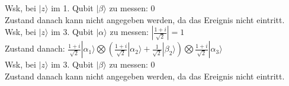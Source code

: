 \documentclass[a4paper]{scrartcl}
\begin{document}
Wsk, bei $|z\rangle$ im 1. Qubit $|\beta\rangle$ zu messen: $0$\\
Zustand danach kann nicht angegeben werden, da das Ereignis nicht eintritt.\\

Wsk, bei $|z\rangle$ im 3. Qubit $|\alpha\rangle$ zu messen: $|\frac{1+i}{\sqrt{2}}| = 1$\\
Zustand danach: $\frac{1+i}{\sqrt{2}} |\alpha_1\rangle \bigotimes (\frac{1+i}{\sqrt{2}} |\alpha_2\rangle + \frac{1}{\sqrt{2}} |\beta_2\rangle) \bigotimes \frac{1+i}{\sqrt{2}} |\alpha_3\rangle $\\

Wsk, bei $|z\rangle$ im 3. Qubit $|\beta\rangle$ zu messen: $0$\\
Zustand danach kann nicht angegeben werden, da das Ereignis nicht eintritt.\\
\newpage
\end{document}

